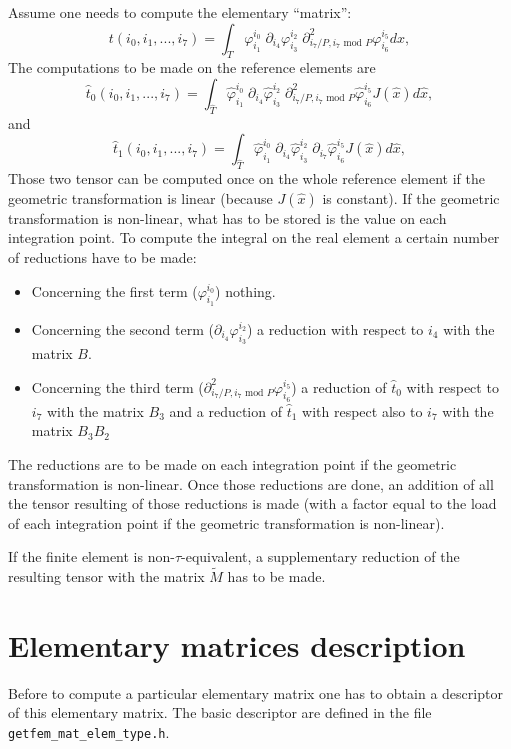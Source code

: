 \documentclass[11pt,a4paper]{article}
\begin{document}
Assume one needs to compute the elementary ``matrix'':
$$ t(i_0, i_1, ..., i_7) = \int_{T} \varphi_{i_1}^{i_0}\; \partial_{i_4} \varphi_{i_3}^{i_2}\; \partial^2_{i_7 / P, i_7 \mbox{ mod } P} \varphi_{i_6}^{i_5} dx, $$ 
The computations to be made on the reference elements are
$$ \hat{t}_0(i_0, i_1, ..., i_7) = \int_{\hat{T}} \hat{\varphi}_{i_1}^{i_0}\; \partial_{i_4} \hat{\varphi}_{i_3}^{i_2}\; \partial^2_{i_7 / P, i_7 \mbox{ mod } P} \hat{\varphi}_{i_6}^{i_5}  J(\hat{x}) d\hat{x}, $$
and
$$ \hat{t}_1(i_0, i_1, ..., i_7) = \int_{\hat{T}} \hat{\varphi}_{i_1}^{i_0}\; \partial_{i_4} \hat{\varphi}_{i_3}^{i_2}\; \partial_{i_7} \hat{\varphi}_{i_6}^{i_5}  J(\hat{x}) d\hat{x}, $$
Those two tensor can be computed once on the whole reference element if the geometric transformation is linear (because $J(\hat{x})$ is constant). If the geometric transformation is non-linear, what has to be stored is the value on each integration point. To compute the integral on the real element a certain number of reductions have to be made:
\begin{itemize}
   \item Concerning the first term ($\varphi_{i_1}^{i_0}$) nothing.
   \item Concerning the second term ($\partial_{i_4} \varphi_{i_3}^{i_2}$) a reduction with respect to $i_4$ with the matrix $B$.
   \item Concerning the third term ($\partial^2_{i_7 / P, i_7 \mbox{ mod } P} \varphi_{i_6}^{i_5}$) a reduction of $\hat{t}_0$ with respect to $i_7$ with the matrix $B_3$ and a reduction of $\hat{t}_1$ with respect also to $i_7$ with the matrix $B_3B_2$
\end{itemize}
The reductions are to be made on each integration point if the geometric transformation is non-linear. Once those reductions are done, an addition of all the tensor resulting of those reductions is made (with a factor equal to the load of each integration point if the geometric transformation is non-linear).

If the finite element is non-$\tau$-equivalent, a supplementary reduction of the resulting tensor with the matrix $\tilde{M}$ has to be made.

\section{Elementary matrices description}

Before to compute a particular elementary matrix one has to obtain a descriptor  of this elementary matrix. The basic descriptor are defined in the file {\tt getfem\_mat\_elem\_type.h}. 
\end{document}
